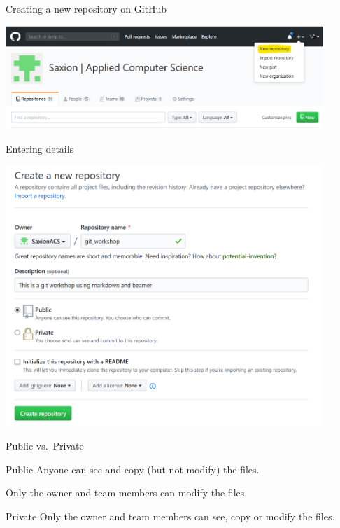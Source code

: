 \documentclass[
  11pt,
  american,
  ignorenonframetext,
  aspectratio=43,
  compress,
  xcolor=dvipsnames]{beamer}
\begin{document}
\begin{frame}{Creating a new repository on GitHub}
\protect\hypertarget{creating-a-new-repository-on-github}{}
\begin{center}
\includegraphics[width=0.9\textwidth]{./images/github_create_new.png}
\end{center}
\end{frame}

\begin{frame}{Entering details}
\protect\hypertarget{entering-details}{}
\begin{center}
\includegraphics[width=0.9\textwidth]{./images/github_new_repo.png}
\end{center}
\end{frame}

\begin{frame}{Public vs.~Private}
\protect\hypertarget{public-vs.-private}{}
\begin{block}{Public}
\protect\hypertarget{public}{}
Anyone can see and copy (but not modify) the files.

Only the owner and team members can modify the files.
\end{block}

\begin{block}{Private}
\protect\hypertarget{private}{}
Only the owner and team members can see, copy or modify the files.
\end{block}
\end{frame}
\end{document}
